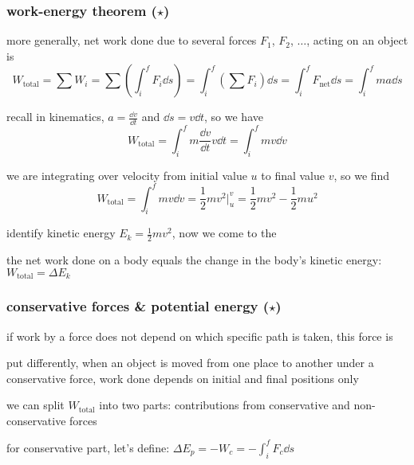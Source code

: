 \subsubsection{work-energy theorem ($\star$)}

more generally, net work done due to several forces $F_1$, $F_2$, $\dots$, acting on an object is
\begin{equation*}
W_\text{total} = \sum W_i = \sum \left(\int_i^f F_i \dd s\right) = \int_i^f \left(\sum F_i \right)\dd s = \int_i^f F_\text{net} \dd s = \int_i^f ma \dd s
\end{equation*}

recall in kinematics, $a=\frac{\dd v}{\dd t}$ and $\dd s = v \dd t$, so we have
\begin{equation*}
W_\text{total} = \int_i^f m \frac{\dd v}{\dd t} v \dd t = \int_i^f m v \dd v
\end{equation*}

we are integrating over velocity from initial value $u$ to final value $v$, so we find
\begin{equation*}
W_\text{total} = \int_i^f m v \dd v = \frac{1}{2}mv^2 \Big|_u^v = \frac{1}{2}mv^2 - \frac{1}{2}mu^2
\end{equation*}

identify kinetic energy $E_k = \frac{1}{2}mv^2$, now we come to the   

\vspace*{-7pt}
\begin{ilight}
	the net work done on a body equals the change in the body's kinetic energy: $\boxed{W_\text{total} = \Delta E_k}$
\end{ilight}



\subsubsection{conservative forces \& potential energy ($\star$)}


if work by a force does not depend on which specific path is taken, this force is 

put differently, when an object is moved from one place to another under a conservative force, work done depends on initial and final positions only

we can split $W_\text{total}$ into two parts: contributions from conservative and non-conservative forces

for conservative part, let's define: $\Delta E_p = - W_{c} = - \int_i^f F_c \dd s $

